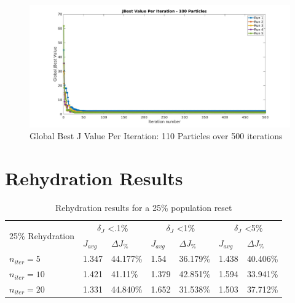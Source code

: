 \begin{figure}[H]
    \includegraphics[width=\linewidth]{./jpgs/globalBestPerIteration500.jpg}
    \caption{Global Best J Value Per Iteration: 110 Particles over 500 iterations}
    \end{figure}
\section{Rehydration Results }

\begin{table}[H]
  \centering
  \begin{tabular}{lll|ll|ll}
    \toprule
    \multirow{2}{*}{25\% Rehydration} &
      \multicolumn{2}{c}{$\delta_{J}$ \textless .1\%} &
      \multicolumn{2}{c}{$\delta_{J}$ \textless 1\%} &
      \multicolumn{2}{c}{$\delta_{J}$ \textless 5\%} \\
      \cmidrule{2-7}
    & $J_{avg}$ & $\Delta J_{\%}$ & $J_{avg}$ & $\Delta J_{\%}$ & $J_{avg}$ & $\Delta J_{\%}$ \\
    \midrule

    $n_{iter}=5$ & 1.347 & 44.177\% & 1.54 & 36.179\% & 1.438 & 40.406\% \\
    $n_{iter}=10$ & 1.421 & 41.11\% & 1.379 & 42.851\% & 1.594 & 33.941\% \\
    $n_{iter}=20$ & 1.331 & 44.840\% & 1.652 & 31.538\% & 1.503 & 37.712\% \\
    \bottomrule
  \end{tabular}
  \caption{Rehydration results for a 25\% population reset}
  \label{tab:rehydation-p25}
\end{table}

